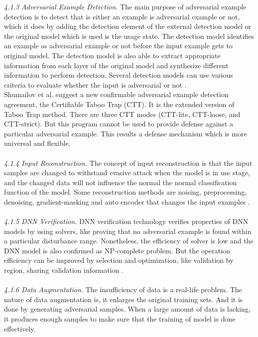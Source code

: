 \documentclass{article}
\begin{document}
\textit{4.1.3 Adversarial Example Detection.}
The main purpose of adversarial example detection is to detect that is either an example is adversarial example or not, which it does by adding the detection element of the external detection model or the original model which is used is the usage state. The detection model identifies an example as adversarial example or not before the input example gets to original model. The detection model is also able to extract appropriate information from each layer of the original model and synthesize different information to perform detection. Several detection models can use various criteria to evaluate whether the input is adversarial or not \cite{carrara2018adversarial}.
\\
Shumailov et al. \cite{shumailov2020towards} suggest a new confirmable adversarial example detection agreement, the Certifiable Taboo Trap (CTT). It is the extended version of Taboo Trap method. There are three CTT modes (CTT-lite, CTT-loose, and CTT-strict). But this program cannot be used to provide defense against a particular adversarial example. This results a defense mechanism which is more universal and flexible.
\\\\
\textit{4.1.4 Input Reconstruction.}
The concept of input reconstruction is that the input samples are changed to withstand evasive attack when the model is in use stage, and the changed data will not influence the normal the normal classification function of the model. Some reconstruction methods are noising, preprocessing, denoising, gradient-masking and auto encoder that changes the input examples \cite{gu2014towards}.
\\\\
\textit{4.1.5 DNN Verification.}
DNN verification technology verifies properties of DNN models by using solvers, like proving that no adversarial example is found within a particular disturbance range. Nonetheless, the efficiency of solver is low and the DNN model is also confirmed as NP-complete problem. But the operation efficiency can be improved by selection and optimization, like validation by region, sharing validation information \cite{qian2020towards}.
\\\\
\textit{4.1.6 Data Augmentation.}
The insufficiency of data is a real-life problem. The nature of data augmentation is, it enlarges the original training sets. And it is done by generating adversarial samples. When a large amount of data is lacking, it produces enough samples to make sure that the training of model is done effectively\cite{shi2018schmidt}.
\end{document}
